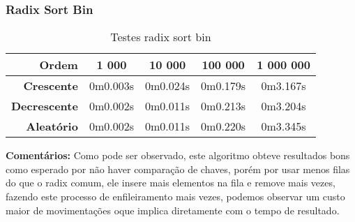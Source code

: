 \documentclass[
	12pt,				%
	oneside,			%
	a4paper,			%
	english,			%
	brazil,				%
	]{article}
\begin{document}
\subsubsection{Radix Sort Bin}
\begin{table}[H]
\centering
\begin{tabular}{|r|c|c|c|c|}
\cline{1-5} 
 \textbf{Ordem} & \textbf{1 000} & \textbf{10 000} & \textbf{100 000} & \textbf{1 000 000}\\
 \hline
 \textbf{Crescente} & 0m0.003s & 0m0.024s & 0m0.179s & 0m3.167s \\
 \hline	
 \textbf{Decrescente} & 0m0.002s & 0m0.011s & 0m0.213s & 0m3.204s \\
 \hline
 \textbf{Aleat{\'o}rio} & 0m0.002s & 0m0.011s & 0m0.220s & 0m3.345s \\
 \hline
\end{tabular} 
\caption{Testes radix sort bin}
\end{table}
\indent \textbf{Comentários:} Como pode ser observado, este algoritmo obteve resultados bons como esperado por não haver comparação de chaves, porém por usar 
menos filas do que o radix comum, ele insere mais elementos na fila e remove mais vezes, fazendo este processo de enfileiramento mais vezes, podemos observar um 
custo maior de movimentações oque implica diretamente com o tempo de resultado.
\newpage
\end{document}
